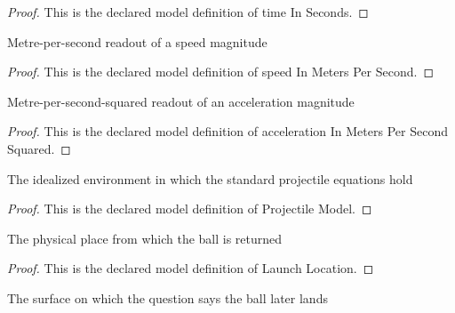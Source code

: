 \begin{proof}
  This is the declared model definition of time In Seconds.
\end{proof}
\begin{definition}
  \label{def:physics:phyx-mini-0685:phyxminiproblems-problemphyxmini0685-speedinmeterspersecond}
  Metre-per-second readout of a speed magnitude
\end{definition}
\begin{proof}
  This is the declared model definition of speed In Meters Per Second.
\end{proof}
\begin{definition}
  \label{def:physics:phyx-mini-0685:phyxminiproblems-problemphyxmini0685-accelerationinmeterspersecondsquared}
  Metre-per-second-squared readout of an acceleration magnitude
\end{definition}
\begin{proof}
  This is the declared model definition of acceleration In Meters Per Second Squared.
\end{proof}
\begin{definition}
  \label{def:physics:phyx-mini-0685:phyxminiproblems-problemphyxmini0685-projectilemodel}
  The idealized environment in which the standard projectile equations hold
\end{definition}
\begin{proof}
  This is the declared model definition of Projectile Model.
\end{proof}
\begin{definition}
  \label{def:physics:phyx-mini-0685:phyxminiproblems-problemphyxmini0685-launchlocation}
  The physical place from which the ball is returned
\end{definition}
\begin{proof}
  This is the declared model definition of Launch Location.
\end{proof}
\begin{definition}
  \label{def:physics:phyx-mini-0685:phyxminiproblems-problemphyxmini0685-landingsurface}
  The surface on which the question says the ball later lands
\end{definition}
